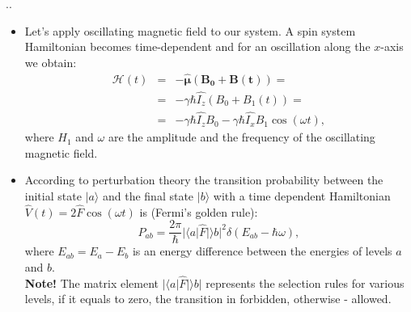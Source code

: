 \documentclass[handout]{beamer}
\begin{document}
\begin{frame}{\thesection.\thesubsection. \insertsubsection}

	\begin{itemize}[<+>]

		\item[]
		{\small
		Let's apply oscillating magnetic field to our system. A spin system Hamiltonian becomes time-dependent and for an oscillation along the $x$-axis we obtain:
		\begin{equation} \label{eq:oscillating_field}
		\begin{array}{lcl}
		\mathcal{H}(t) &=& -\bm{\hat{\mu}} \bm{(B_0+B(t))}=  \\
		&=& -\gamma \hbar \hat{I_z} (B_0 + B_1(t)) =\\
		&=&-\gamma \hbar \hat{I_z} B_0  -\gamma \hbar \hat{I_x} B_1 \cos(\omega t),
		\end{array}
		\end{equation}
		where $H_1$ and $\omega$ are the amplitude and the frequency of the oscillating magnetic field.
	}%
		\item[]
				{\small
		According to perturbation theory the transition probability between the initial state $\vert a \rangle$ and the final state $\vert b \rangle$ with a time dependent Hamiltonian $ \hat{V} (t) = 2 \hat{F} \cos (\omega t ) $ is (Fermi's golden rule):
		\begin{equation} \label{eq:probability}
		P_{ab} = \frac{2 \pi}{\hbar} \vert \langle a \vert \hat{F} \vert \rangle b \vert ^2 \delta(E_{ab}-\hbar \omega),
		\end{equation}
		where $E_{ab} = E_a - E_b$ is an energy difference between the energies of levels $a$ and $b$. \\		
		\textbf{Note!} The matrix element $\vert \langle a \vert \hat{F} \vert \rangle b \vert$ represents the selection rules for various levels, if it equals to zero, the transition in 
		forbidden, otherwise - allowed.		    
	}%
	\end{itemize}

\end{frame}	
\end{document}
